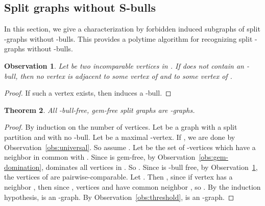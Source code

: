 \documentclass[11pt,3p,times]{elsarticle}
\newenvironment{myproof}{\begin{proof}}{\end{proof}}
\newtheorem{theorem}{Theorem}
\newtheorem{observation}[theorem]{Observation}
\begin{document}
\subsection{Split graphs without S-bulls}
In this section, we give a characterization by forbidden induced
subgraphs of split -graphs without -bulls. This provides
a polytime algorithm for recognizing split -graphs without
-bulls.
\begin{observation}\label{obs:bull}
Let  be two incomparable vertices in . If  does
not contain an -bull, then no vertex  is adjacent to
some vertex  of  and to some vertex  of
.
\end{observation}
\begin{myproof}
If such a vertex  exists, then  induces a -bull.
\end{myproof}
\begin{theorem}\label{thm:S-bull-gem-free}
All -bull-free, gem-free split graphs are -graphs.
\end{theorem}
\begin{myproof}
By induction on the number of vertices. Let  be a graph with a
split partition  and with no -bull. Let  be a maximal -vertex.
If , we are done by Observation~\ref{obs:universal}. So
assume . Let  be the set of -vertices which have a neighbor
in common with . Since  is gem-free, by Observation~\ref{obs:gem-domination},
 dominates all vertices in . So . Since  is -bull
free, by Observation~\ref{obs:bull}, the vertices of  are pairwise-comparable.
Let . Then , since if vertex 
has a neighbor , then since , vertices  and  have
common neighbor , so . By the induction hypothesis,
 is an -graph.  By Observation~\ref{obs:threshold}, 
is an -graph.
\end{myproof}
\end{document}
